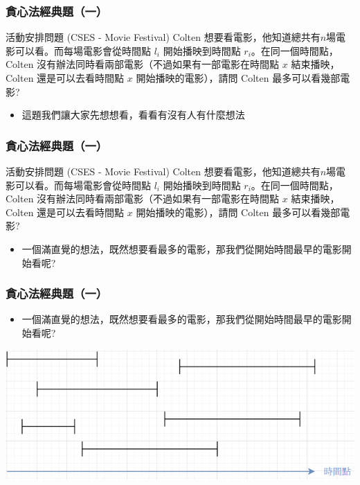 \documentclass[aspectratio=169]{beamer}
\begin{document}
\begin{frame}
\frametitle{貪心法經典題（一）}
    \begin{block}{活動安排問題 (CSES - Movie Festival)}
        Colten 想要看電影，他知道總共有$n$場電影可以看。而每場電影會從時間點 $l_i$ 開始播映到時間點 $r_i$。在同一個時間點，Colten 沒有辦法同時看兩部電影（不過如果有一部電影在時間點 $x$ 結束播映，Colten 還是可以去看時間點 $x$ 開始播映的電影），請問 Colten 最多可以看幾部電影?
    \end{block}
    
    \begin{itemize}
    \item<1-> 這題我們讓大家先想想看，看看有沒有人有什麼想法
    \end{itemize}
\end{frame}

\begin{frame}
\frametitle{貪心法經典題（一）}
    \begin{block}{活動安排問題 (CSES - Movie Festival)}
        Colten 想要看電影，他知道總共有$n$場電影可以看。而每場電影會從時間點 $l_i$ 開始播映到時間點 $r_i$。在同一個時間點，Colten 沒有辦法同時看兩部電影（不過如果有一部電影在時間點 $x$ 結束播映，Colten 還是可以去看時間點 $x$ 開始播映的電影），請問 Colten 最多可以看幾部電影?
    \end{block}
    
    \begin{itemize}
    \item<1-> 一個滿直覺的想法，既然想要看最多的電影，那我們從開始時間最早的電影開始看呢?
    \end{itemize}
\end{frame}

\begin{frame}
\frametitle{貪心法經典題（一）}
    \begin{itemize}
    \item<1-> 一個滿直覺的想法，既然想要看最多的電影，那我們從開始時間最早的電影開始看呢?
    \end{itemize}
    
    \begin{center}
        \includegraphics[scale=0.75]{images/movie_festival_1.png}
    \end{center}
\end{frame}
\end{document}
